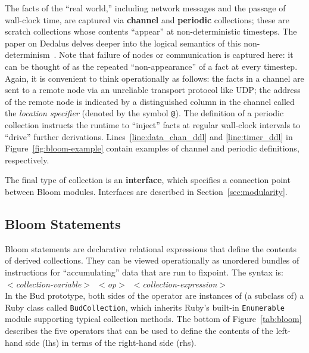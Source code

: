 The facts of the ``real world,'' including network messages and the passage of
wall-clock time, are captured via \textbf{channel} and \textbf{periodic}
collections; these are scratch collections whose contents ``appear'' at
non-deterministic timesteps.  The paper on Dedalus delves deeper into the
logical semantics of this non-determinism~\cite{dedalus}. Note that failure of
nodes or communication is captured here: it can be thought of as the repeated
``non-appearance'' of a fact at every timestep.  Again, it is convenient to
think operationally as follows: the facts in a channel are sent to a remote node
via an unreliable transport protocol like UDP; the address of the remote node is
indicated by a distinguished column in the channel called the \emph{location
  specifier} (denoted by the symbol \texttt{@}). The definition of a periodic
collection instructs the runtime to ``inject'' facts at regular wall-clock
intervals to ``drive'' further derivations. Lines~\ref{line:data_chan_ddl} and
\ref{line:timer_ddl} in Figure~\ref{fig:bloom-example} contain examples of
channel and periodic definitions, respectively.

The final type of collection is an \textbf{interface}, which specifies a
connection point between Bloom modules. Interfaces are described in
Section~\ref{sec:modularity}.

\subsection{Bloom Statements}
Bloom statements are declarative relational expressions that define the contents
of derived collections.  They can be viewed operationally as unordered bundles
of instructions for ``accumulating'' data that are run to fixpoint.  The syntax
is:\\ \noindent
\mbox{\hspace{0.25in}\emph{$<$collection-variable$>$ $<$op$>$
$<$collection-expression$>$}}\\ \noindent In the Bud prototype, both sides of
the operator are instances of (a subclass of) a Ruby class called
\texttt{BudCollection}, which inherits Ruby's built-in \texttt{Enumerable}
module supporting typical collection methods.  The bottom of Figure~\ref{tab:bloom} describes
the five operators that can be used to define the contents of the left-hand
side (lhs) in terms of the right-hand side (rhs).  

